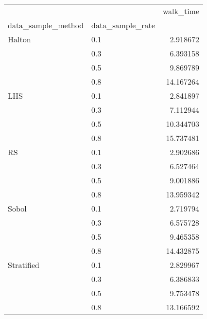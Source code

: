 \begin{tabular}{llr}
\toprule
           &     &  walk\_time \\
data\_sample\_method & data\_sample\_rate &            \\
\midrule
Halton & 0.1 &   2.918672 \\
           & 0.3 &   6.393158 \\
           & 0.5 &   9.869789 \\
           & 0.8 &  14.167264 \\
LHS & 0.1 &   2.841897 \\
           & 0.3 &   7.112944 \\
           & 0.5 &  10.344703 \\
           & 0.8 &  15.737481 \\
RS & 0.1 &   2.902686 \\
           & 0.3 &   6.527464 \\
           & 0.5 &   9.001886 \\
           & 0.8 &  13.959342 \\
Sobol & 0.1 &   2.719794 \\
           & 0.3 &   6.575728 \\
           & 0.5 &   9.465358 \\
           & 0.8 &  14.432875 \\
Stratified & 0.1 &   2.829967 \\
           & 0.3 &   6.386833 \\
           & 0.5 &   9.753478 \\
           & 0.8 &  13.166592 \\
\bottomrule
\end{tabular}
